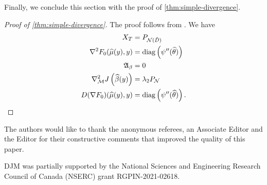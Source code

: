 \documentclass[ejs,noshowframe]{imsart}
\theoremstyle{plain}
\theoremstyle{definition}
\newcommand{\cN}{\mathcal{N}}
\renewcommand{\hat}{\widehat}
\DeclareMathOperator*{\diag}{diag}
\newcommand{\Pnd}{P_{\cN(\breve{D})}}
\begin{document}
\begin{appendix}
Finally, we conclude this section with the proof of \autoref{thm:simple-divergence}.

\begin{proof}[Proof of \autoref{thm:simple-divergence}]
  The proof follows from \citet[Theorem 2]{VaiterDeledalle2017}. We have
  \begin{align}
    X_T &= \Pnd\\
    \nabla^2 F_0(\hat\mu(y),y) &= \diag\left( \psi''(\hat\theta) \right)\\
    \mathfrak{A}_\beta &= 0\\
    \nabla^2_{\mathcal{M}} J\left( \hat\beta(y) \right) &= \lambda_2P_\cN\\
    D(\nabla F_0)(\hat\mu(y),y) &= \diag\left( \psi''(\hat\theta) 
    \right).\qedhere
  \end{align}
\end{proof}

\end{appendix}



\begin{acks}[Acknowledgments]
  The authors would like to thank the anonymous referees, an Associate
  Editor and the Editor for their constructive comments that improved the
  quality of this paper.
\end{acks}

\begin{funding}
  DJM was partially supported by the National Sciences and Engineering Research
  Council of Canada (NSERC) grant RGPIN-2021-02618.
\end{funding}



\end{document}
